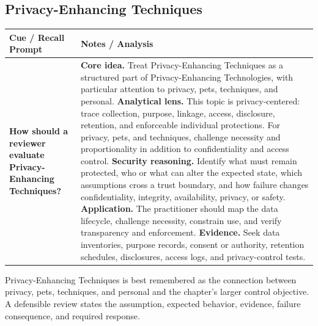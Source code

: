 \documentclass[11pt]{article}
\newcommand{\CornellHeader}{%
\rowcolor{Navy}\color{white}\bfseries Cue / Recall Prompt & \color{white}\bfseries Notes / Analysis\\\hline}
\newcommand{\CornellRow}[2]{%
\cellcolor{CueGray}\RaggedRight\textbf{#1} & \RaggedRight #2\\\hline}
\begin{document}
\subsection*{Privacy-Enhancing Techniques}
\begin{longtable}{>{\RaggedRight\arraybackslash}p{}|>{\RaggedRight\arraybackslash}p{}}
\CornellHeader
\CornellRow{How should a reviewer evaluate Privacy-Enhancing Techniques?}{\textbf{Core idea.} Treat Privacy-Enhancing Techniques as a structured part of Privacy-Enhancing Technologies, with particular attention to privacy, pets, techniques, and personal. \textbf{Analytical lens.} This topic is privacy-centered: trace collection, purpose, linkage, access, disclosure, retention, and enforceable individual protections. For privacy, pets, and techniques, challenge necessity and proportionality in addition to confidentiality and access control. \textbf{Security reasoning.} Identify what must remain protected, who or what can alter the expected state, which assumptions cross a trust boundary, and how failure changes confidentiality, integrity, availability, privacy, or safety. \textbf{Application.} The practitioner should map the data lifecycle, challenge necessity, constrain use, and verify transparency and enforcement. \textbf{Evidence.} Seek data inventories, purpose records, consent or authority, retention schedules, disclosures, access logs, and privacy-control tests.}
\end{longtable}
\begin{topicsummary}
Privacy-Enhancing Techniques is best remembered as the connection between privacy, pets, techniques, and personal and the chapter's larger control objective. A defensible review states the assumption, expected behavior, evidence, failure consequence, and required response.
\end{topicsummary}
\end{document}
